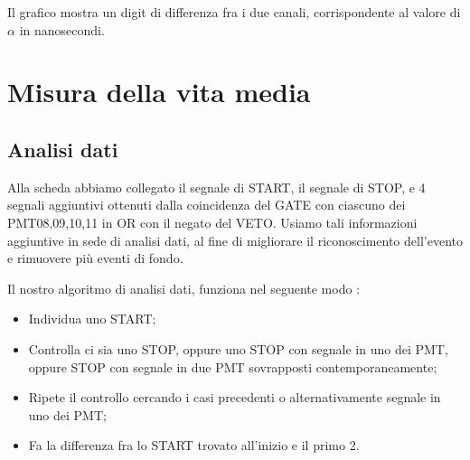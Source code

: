 \documentclass[10pt,a4paper]{article}
\begin{document}
Il grafico mostra un digit di differenza fra i due canali, corrispondente al valore di $\alpha$ in nanosecondi.

\section{Misura della vita media}

\subsection{Analisi dati}

Alla scheda abbiamo collegato il segnale di START, il segnale di STOP, e 4 segnali aggiuntivi ottenuti dalla coincidenza del GATE con ciascuno dei PMT08,09,10,11 in OR con il negato del VETO.
Usiamo tali informazioni aggiuntive in sede di analisi dati, al fine di migliorare il riconoscimento dell'evento e rimuovere più eventi di fondo. 

Il nostro algoritmo di analisi dati, funziona nel seguente modo :

\begin{itemize}
\item Individua uno START;
\item Controlla ci sia uno STOP, oppure uno STOP con segnale in uno dei PMT, oppure STOP con segnale in due PMT sovrapposti contemporaneamente;
\item Ripete il controllo cercando i casi precedenti o alternativamente segnale in uno dei PMT;
\item Fa la differenza fra lo START trovato all'inizio e il primo 2.
\end{itemize}
\end{document}
